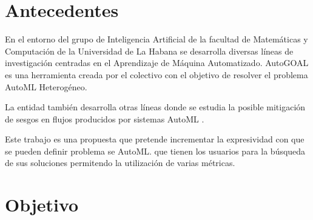 

\section*{Antecedentes}

En el entorno del grupo de Inteligencia Artificial de la facultad de Matem\'aticas y Computaci\'on de la Universidad de La Habana se desarrolla diversas l\'ineas de investigaci\'on centradas en el Aprendizaje de M\'aquina Automatizado. AutoGOAL  es una herramienta creada por el colectivo con el objetivo de resolver el problema AutoML Heterog\'eneo.

La entidad tambi\'en desarrolla otras l\'ineas donde se estudia la posible mitigaci\'on de sesgos en flujos producidos por sistemas AutoML . 

Este trabajo es una propuesta que pretende incrementar la expresividad con que se pueden definir problema se AutoML. que tienen los usuarios para la b\'usqueda de sus soluciones permitendo la utilizaci\'on de varias m\'etricas.


 
\section*{Objetivo}
